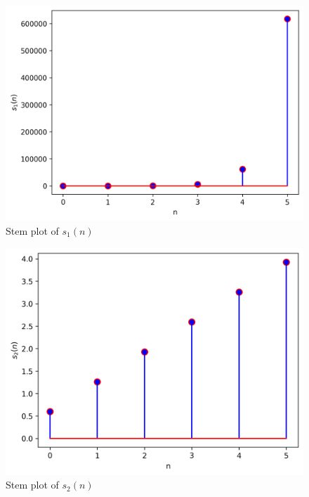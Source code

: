 \documentclass[journal,12pt,twocolumn]{IEEEtran}
\theoremstyle{remark}
\begin{document}
\begin{figure}[h!]
    \centering
    \includegraphics[width=\columnwidth]{figs/data_x1.png}
    \caption{Stem plot of $s_1(n)$}
    \label{fig: sr4}
\end{figure}
\begin{figure}[h!]
    \centering
    \includegraphics[width=\columnwidth]{figs/data_x2.png}
    \caption{Stem plot of $s_2(n)$}
    \label{fig: sr7}
\end{figure}
\end{document}
